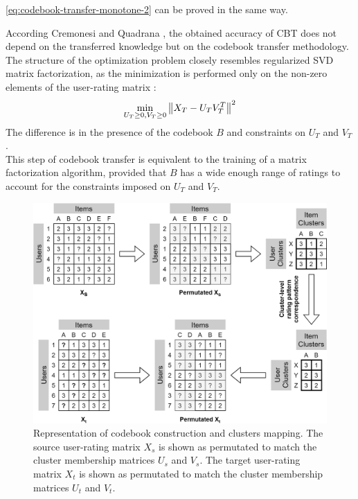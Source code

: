 \autoref{eq:codebook-transfer-monotone-2} can be proved in the same way.\par
According Cremonesi and Quadrana \cite{10.1145/2645710.2645769}, the obtained accuracy of CBT does not depend on the transferred knowledge but on the codebook transfer methodology. The structure of the optimization problem closely resembles regularized SVD matrix factorization, as the minimization is performed only on the non-zero elements of the user-rating matrix \cite{10.1145/1401890.1401944}:
\begin{equation*}
\min_{U_T \geq 0, V_T \geq 0} \left\lVert X_T - U_T V_T^T\right\rVert^2
\end{equation*}
The difference is in the presence of the codebook $B$ and constraints on $U_T$ and $V_T$.\\
This step of codebook transfer is equivalent to the training of a matrix factorization algorithm, provided that $B$ has a wide enough range of ratings to account for the constraints imposed on $U_T$ and $V_T$.
\begin{figure}[hbt]
\centering
\includegraphics[width=\textwidth]{pictures/codebook-construction}
\caption{Representation of codebook construction and clusters mapping. The source user-rating matrix $X_s$ is shown as permutated to match the cluster membership matrices $U_s$ and $V_s$. The target user-rating matrix $X_t$ is shown as permutated to match the cluster membership matrices $U_t$ and $V_t$.}
\label{fg:codebook-construction}
\end{figure}
